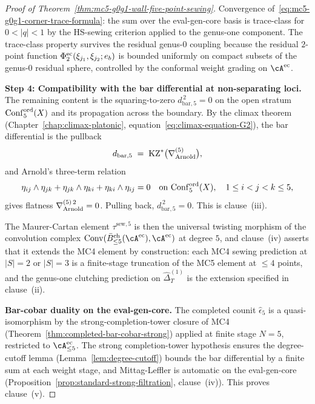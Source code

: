 \begin{proof}[Proof of Theorem~\ref{thm:mc5-g0g1-wall-five-point-sewing}]
Convergence of~\eqref{eq:mc5-g0g1-corner-trace-formula}: the sum over
the eval-gen-core basis is trace-class for $0 < |q| < 1$ by the
HS-sewing criterion applied to the genus-one component. The trace-class
property survives the residual genus-$0$ coupling because the residual
$2$-point function $\Phi^{\mathrm{ec}}_{2}(\xi_{j_{1}}, \xi_{j_{2}}; e_{b})$
is bounded uniformly on compact subsets of the genus-$0$ residual sphere,
controlled by the conformal weight grading on $\cA^{\evcore}$.

\medskip
\textbf{Step 4: Compatibility with the bar differential at non-separating loci.}
The remaining content is the squaring-to-zero
$d_{\mathrm{bar}, 5}^{\, 2} = 0$ on the open stratum $\mathrm{Conf}^{\mathrm{ord}}_{5}(X)$
and its propagation across the boundary. By the climax theorem
\textup{(}Chapter~\ref{chap:climax-platonic}, equation~\eqref{eq:climax-equation-G2}\textup{)},
the bar differential is the pullback
\begin{equation}
\label{eq:mc5-g0g1-bar-differential-pullback}
d_{\mathrm{bar}, 5} \;=\; \mathrm{KZ}^{*}\bigl(\nabla^{(5)}_{\mathrm{Arnold}}\bigr),
\end{equation}
and Arnold's three-term relation
\begin{equation}
\label{eq:mc5-g0g1-arnold-three-term}
\eta_{ij} \wedge \eta_{jk} + \eta_{jk} \wedge \eta_{ki} + \eta_{ki} \wedge \eta_{ij} = 0
\quad\text{on } \mathrm{Conf}^{\mathrm{ord}}_{5}(X), \quad 1 \le i < j < k \le 5,
\end{equation}
gives flatness $\nabla^{(5)\, 2}_{\mathrm{Arnold}} = 0$. Pulling back, $d_{\mathrm{bar}, 5}^{\, 2} = 0$.
This is clause~(iii).

The Maurer-Cartan element $\tau^{\mathrm{sew}, 5}$ is then the universal
twisting morphism of the convolution complex
$\Conv(\BarOrd_{\le 5}(\cA^{\evcore}), \cA^{\evcore})$ at degree $5$, and
clause~(iv) asserts that it extends the MC4 element by construction:
each MC4 sewing prediction at $|S| = 2$ or $|S| = 3$ is a finite-stage
truncation of the MC5 element at $\le 4$ points, and the
genus-one clutching prediction on $\widehat{\Delta}^{(1)}_{T}$ is the
extension specified in clause~(ii).

\medskip
\textbf{Bar-cobar duality on the eval-gen-core.}
The completed counit $\widehat{\epsilon}_{5}$ is a quasi-isomorphism by
the strong-completion-tower closure of MC4
\textup{(}Theorem~\ref{thm:completed-bar-cobar-strong}\textup{)} applied
at finite stage $N = 5$, restricted to $\cA^{\evcore}_{\le 5}$. The
strong completion-tower hypothesis ensures the degree-cutoff lemma
\textup{(}Lemma~\ref{lem:degree-cutoff}\textup{)} bounds
the bar differential by a finite sum at each weight stage, and
Mittag-Leffler is automatic on the eval-gen-core
\textup{(}Proposition~\ref{prop:standard-strong-filtration},
clause~(iv)\textup{)}. This proves clause~(v).


\end{proof}
